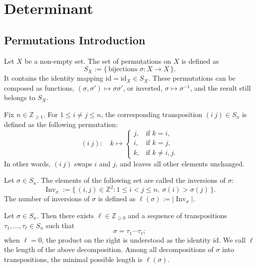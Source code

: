 \chapter{Determinant}

\section{Permutations Introduction}

\begin{definition}
Let $X$ be a non-empty set. The set of permutations on $X$ is defined as
\[
S_X := \{\, \text{bijections } \sigma : X \to X \,\} .
\]
It contains the identity mapping $\mathrm{id} = \mathrm{id}_X \in S_X$. These permutations can be composed as functions, $(\sigma, \sigma') \mapsto \sigma \sigma'$, or inverted, $\sigma \mapsto \sigma^{-1}$, and the result still belongs to $S_X$.
\end{definition}

\begin{definition}
Fix $n \in \mathbb{Z}_{\geq 1}$. For $1 \leq i \neq j \leq n$, the corresponding transposition $(i\ j) \in S_n$ is defined as the following permutation:
\[
(i\ j):\quad k \mapsto
\begin{cases}
j, & \text{if } k = i, \\
i, & \text{if } k = j, \\
k, & \text{if } k \neq i, j.
\end{cases}
\]
In other words, $(i\ j)$ swaps $i$ and $j$, and leaves all other elements unchanged.
\end{definition}

\begin{definition}
Let $\sigma \in S_n$. The elements of the following set are called the inversions of $\sigma$:
\[
\operatorname{Inv}_\sigma := \{\, (i, j) \in \mathbb{Z}^2 : 1 \leq i < j \leq n,\ \sigma(i) > \sigma(j) \,\}.
\]
The number of inversions of $\sigma$ is defined as $\ell(\sigma) := |\operatorname{Inv}_\sigma|$.
\end{definition}

\begin{proposition}
Let $\sigma \in S_n$. Then there exists $\ell \in \mathbb{Z}_{\geq 0}$ and a sequence of transpositions $\tau_1, \ldots, \tau_\ell \in S_n$ such that
\[
\sigma = \tau_1 \cdots \tau_\ell ;
\]
when $\ell = 0$, the product on the right is understood as the identity $\mathrm{id}$. We call $\ell$ the length of the above decomposition. Among all decompositions of $\sigma$ into transpositions, the minimal possible length is $\ell(\sigma)$.
\end{proposition}
